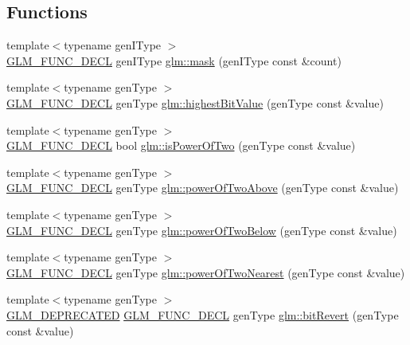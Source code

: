 \subsection*{Functions}
\begin{DoxyCompactItemize}
\item 
{\footnotesize template$<$typename gen\+I\+Type $>$ }\\\hyperlink{setup_8hpp_ab2d052de21a70539923e9bcbf6e83a51}{G\+L\+M\+\_\+\+F\+U\+N\+C\+\_\+\+D\+E\+CL} gen\+I\+Type \hyperlink{group__gtx__bit_ga79f1482a09c91f785e7e0ea8aed2b20e}{glm\+::mask} (gen\+I\+Type const \&count)
\item 
{\footnotesize template$<$typename gen\+Type $>$ }\\\hyperlink{setup_8hpp_ab2d052de21a70539923e9bcbf6e83a51}{G\+L\+M\+\_\+\+F\+U\+N\+C\+\_\+\+D\+E\+CL} gen\+Type \hyperlink{group__gtx__bit_ga9621840252c293918780bc3890374b86}{glm\+::highest\+Bit\+Value} (gen\+Type const \&value)
\item 
{\footnotesize template$<$typename gen\+Type $>$ }\\\hyperlink{setup_8hpp_ab2d052de21a70539923e9bcbf6e83a51}{G\+L\+M\+\_\+\+F\+U\+N\+C\+\_\+\+D\+E\+CL} bool \hyperlink{group__gtx__bit_ga5ddca7546d8be35992eedd3411842545}{glm\+::is\+Power\+Of\+Two} (gen\+Type const \&value)
\item 
{\footnotesize template$<$typename gen\+Type $>$ }\\\hyperlink{setup_8hpp_ab2d052de21a70539923e9bcbf6e83a51}{G\+L\+M\+\_\+\+F\+U\+N\+C\+\_\+\+D\+E\+CL} gen\+Type \hyperlink{group__gtx__bit_gaa49786cf3f8a1f65de6e70b6088a811e}{glm\+::power\+Of\+Two\+Above} (gen\+Type const \&value)
\item 
{\footnotesize template$<$typename gen\+Type $>$ }\\\hyperlink{setup_8hpp_ab2d052de21a70539923e9bcbf6e83a51}{G\+L\+M\+\_\+\+F\+U\+N\+C\+\_\+\+D\+E\+CL} gen\+Type \hyperlink{group__gtx__bit_gaeceaea338213cbff7a275460e35e8d0c}{glm\+::power\+Of\+Two\+Below} (gen\+Type const \&value)
\item 
{\footnotesize template$<$typename gen\+Type $>$ }\\\hyperlink{setup_8hpp_ab2d052de21a70539923e9bcbf6e83a51}{G\+L\+M\+\_\+\+F\+U\+N\+C\+\_\+\+D\+E\+CL} gen\+Type \hyperlink{group__gtx__bit_ga9e68299f4ca0cd6674efbee62d425b95}{glm\+::power\+Of\+Two\+Nearest} (gen\+Type const \&value)
\item 
{\footnotesize template$<$typename gen\+Type $>$ }\\\hyperlink{setup_8hpp_a8edfb48cdc249a3ee48406bf179023dc}{G\+L\+M\+\_\+\+D\+E\+P\+R\+E\+C\+A\+T\+ED} \hyperlink{setup_8hpp_ab2d052de21a70539923e9bcbf6e83a51}{G\+L\+M\+\_\+\+F\+U\+N\+C\+\_\+\+D\+E\+CL} gen\+Type \hyperlink{group__gtx__bit_ga2d3939fbf96aa54cb2fd3461a60aba02}{glm\+::bit\+Revert} (gen\+Type const \&value)

\end{DoxyCompactItemize}
